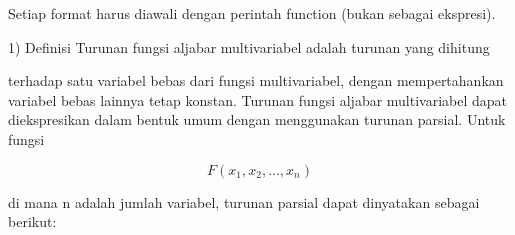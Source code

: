 \documentclass[a4paper,10pt]{article}
\begin{document}
\begin{eulernotebook}
\begin{eulercomment}
Setiap format harus diawali dengan perintah function (bukan sebagai
ekspresi).

\begin{eulercomment}
\begin{eulercomment}
\begin{eulercomment}
\begin{eulercomment}
\end{eulercomment}
\begin{eulerttcomment}
 1) Definisi
    Turunan fungsi aljabar multivariabel adalah turunan yang dihitung
\end{eulerttcomment}
\begin{eulercomment}
terhadap satu variabel bebas dari fungsi multivariabel, dengan
mempertahankan variabel bebas lainnya tetap konstan. Turunan fungsi
aljabar multivariabel dapat diekspresikan dalam bentuk umum dengan
menggunakan turunan parsial. Untuk fungsi

\end{eulercomment}
\begin{eulerformula}
\[
F(x_1,x_2,...,x_n)
\]
\end{eulerformula}
\begin{eulercomment}
di mana n adalah jumlah variabel, turunan parsial dapat dinyatakan
sebagai berikut:


\end{eulercomment}
\end{eulercomment}
\end{eulercomment}
\end{eulercomment}
\end{eulercomment}
\end{eulernotebook}
\end{document}
